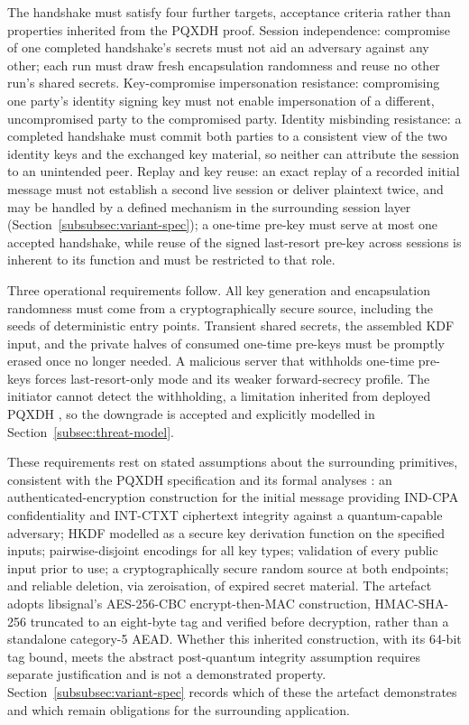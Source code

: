 The handshake must satisfy four further targets, acceptance criteria rather than properties inherited from the PQXDH proof. Session independence: compromise of one completed handshake's secrets must not aid an adversary against any other; each run must draw fresh encapsulation randomness and reuse no other run's shared secrets. Key-compromise impersonation resistance: compromising one party's identity signing key must not enable impersonation of a different, uncompromised party to the compromised party. Identity misbinding resistance: a completed handshake must commit both parties to a consistent view of the two identity keys and the exchanged key material, so neither can attribute the session to an unintended peer. Replay and key reuse: an exact replay of a recorded initial message must not establish a second live session or deliver plaintext twice, and may be handled by a defined mechanism in the surrounding session layer (Section~\ref{subsubsec:variant-spec}); a one-time pre-key must serve at most one accepted handshake, while reuse of the signed last-resort pre-key across sessions is inherent to its function and must be restricted to that role.

Three operational requirements follow. All key generation and encapsulation randomness must come from a cryptographically secure source, including the seeds of deterministic entry points. Transient shared secrets, the assembled KDF input, and the private halves of consumed one-time pre-keys must be promptly erased once no longer needed. A malicious server that withholds one-time pre-keys forces last-resort-only mode and its weaker forward-secrecy profile. The initiator cannot detect the withholding, a limitation inherited from deployed PQXDH \cite{kret_pqxdh_nodate}, so the downgrade is accepted and explicitly modelled in Section~\ref{subsec:threat-model}.

These requirements rest on stated assumptions about the surrounding primitives, consistent with the PQXDH specification and its formal analyses \cite{kret_pqxdh_nodate, bhargavan_formal_2024}: an authenticated-encryption construction for the initial message providing IND-CPA confidentiality and INT-CTXT ciphertext integrity against a quantum-capable adversary; HKDF modelled as a secure key derivation function on the specified inputs; pairwise-disjoint encodings for all key types; validation of every public input prior to use; a cryptographically secure random source at both endpoints; and reliable deletion, via zeroisation, of expired secret material. The artefact adopts libsignal's AES-256-CBC encrypt-then-MAC construction, HMAC-SHA-256 truncated to an eight-byte tag and verified before decryption, rather than a standalone category-5 AEAD. Whether this inherited construction, with its 64-bit tag bound, meets the abstract post-quantum integrity assumption requires separate justification and is not a demonstrated property. Section~\ref{subsubsec:variant-spec} records which of these the artefact demonstrates and which remain obligations for the surrounding application.

